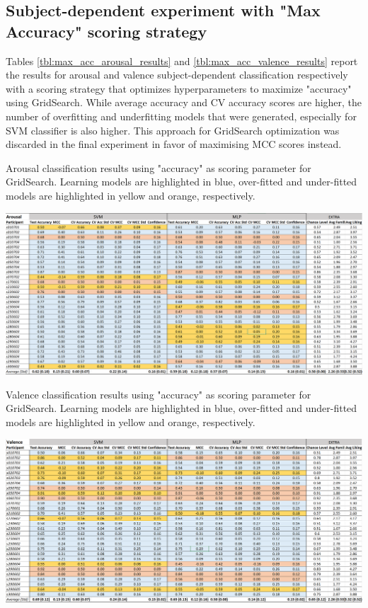 \subsection{Subject-dependent experiment with "Max Accuracy" scoring strategy}
\label{sec:appendix_A3.5}
Tables \ref{tbl:max_acc_arousal_results} and \ref{tbl:max_acc_valence_results} report the results for arousal and valence subject-dependent classification respectively with a scoring strategy that optimizes hyperparameters to maximize "accuracy" using GridSearch. While average accuracy and CV accuracy scores are higher, the number of overfitting and underfitting models that were generated, especially for \ac{SVM} classifier is also higher. This approach for GridSearch optimization was discarded in the final experiment in favor of maximising \ac{MCC} scores instead.
\begin{table}[h!]
  \caption{Arousal classification results using "accuracy" as scoring parameter for GridSearch. Learning models are highlighted in blue, over-fitted and under-fitted models are highlighted in yellow and orange, respectively.}
  \label{tbl:max_acc_arousal_results}
  \includegraphics[width=\linewidth]{img/appendix/arousal_max_acc_results.png}
\end{table}

\begin{table}[h!]
  \caption{Valence classification results using "accuracy" as scoring parameter for GridSearch. Learning models are highlighted in blue, over-fitted and under-fitted models are highlighted in yellow and orange, respectively.}
  \label{tbl:max_acc_valence_results}
  \includegraphics[width=\linewidth]{img/appendix/valence_max_acc_results.png}
\end{table}


